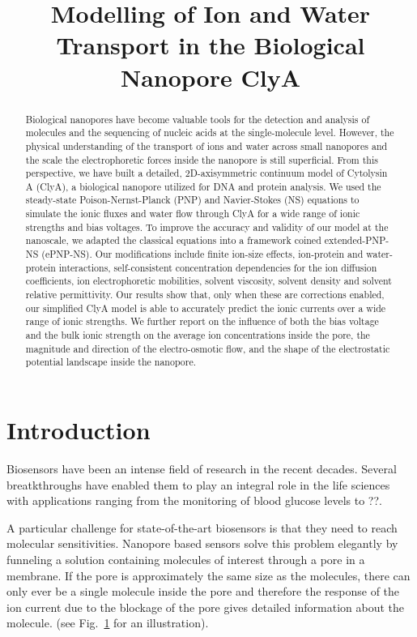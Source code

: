 \documentclass[journal=ancac3, manuscript=article, etalmode=truncate,maxauthors=0]{achemso}
\title{Modelling of Ion and Water Transport in the Biological Nanopore ClyA}
\begin{document}
\maketitle
\newpage
\begin{abstract}
Biological nanopores have become valuable tools for the detection and analysis of molecules and the 
sequencing of nucleic acids at the single-molecule level. However, the physical understanding of the 
transport of ions and water across small nanopores and the scale the electrophoretic forces inside the 
nanopore is still superficial. From this perspective, we have built a detailed, 2D-axisymmetric continuum 
model of Cytolysin A (ClyA), a biological nanopore utilized for DNA and protein analysis. We used the 
steady-state Poison-Nernst-Planck (PNP) and Navier-Stokes (NS) equations to simulate the ionic fluxes and 
water flow through ClyA for a wide range of ionic strengths and bias voltages. To improve the accuracy and 
validity of our model at the nanoscale, we adapted the classical equations into a framework coined 
extended-PNP-NS (ePNP-NS). Our modifications include finite ion-size effects, ion-protein and water-protein 
interactions, self-consistent concentration dependencies for the ion diffusion coefficients, ion 
electrophoretic mobilities, solvent viscosity, solvent density and solvent relative permittivity. Our results 
show that, only when these are corrections enabled, our simplified ClyA model is able to accurately predict 
the ionic currents over a wide range of ionic strengths. We further report on the influence of both the bias 
voltage and the bulk ionic strength on the average ion concentrations inside the pore, the magnitude and 
direction of the electro-osmotic flow, and the shape of the electrostatic potential landscape inside the 
nanopore.
\end{abstract}
\newpage
\section{Introduction}
Biosensors have been an intense field of research in the recent decades.\cite{zhan2015}
Several breatkthroughs have enabled them to play an integral role in the life sciences with
applications ranging from the monitoring of blood glucose levels\cite{chen2013} to ??. 

A particular challenge for state-of-the-art biosensors is that they need to reach molecular
sensitivities.  Nanopore based sensors solve this problem elegantly by funneling a solution
containing molecules of interest through a pore in a membrane. If the pore is approximately the
same size as the molecules, there can only ever be a single molecule inside the pore and therefore the 
response of the ion current due to the blockage of the pore gives detailed information about the molecule. 
(see Fig.~\ref{} for an illustration).
\end{document}
